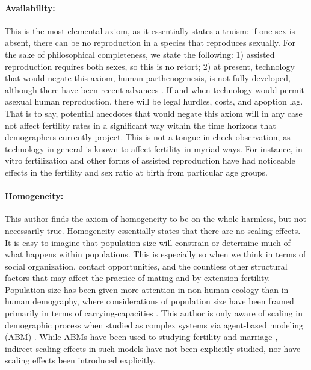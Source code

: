 \paragraph{Availability:} This is the most elemental axiom, as it essentially
states a truism: if one sex is absent, there can be no reproduction in a species
that reproduces sexually. For the sake of philosophical completeness, we state
the following: 1) assisted reproduction requires both sexes, so this is no
retort; 2) at present, technology that would negate this axiom, human
parthenogenesis, is not fully developed, although there have been recent
advances \citep{revazova2007patient}. If and when technology would permit
asexual human reproduction, there will be legal hurdles, costs, and apoption lag. 
That is to say, potential anecdotes that would negate this axiom
will in any case not affect fertility rates in a significant way within the time
horizons that demographers currently project. This is not a tongue-in-cheek
observation, as technology in general is known to affect fertility in myriad
ways. For instance, in vitro fertilization and other forms of assisted
reproduction have had noticeable effects in the fertility and sex ratio at birth from particular
age groups.

\paragraph{Homogeneity:} This author finds the axiom of homogeneity to be on the
whole harmless, but not necessarily true. Homogeneity essentially states that
there are no scaling effects. It is easy to imagine that population size will
constrain or determine much of what happens within populations. This is
especially so when we think in terms of social organization, contact
opportunities, and the countless other structural factors that may affect the
practice of mating and by extension fertility. Population size has been
given more attention in non-human ecology \citep{donalson1999population} than in
human demography, where considerations of population size have been framed
primarily in terms of carrying-capacities \citep[see
e.g., ][]{cohen1995human,hopfenberg2003human}. This author is only aware of
scaling in demographic process when studied as complex systems via agent-based modeling (ABM) \citep[e.g., ][]{bruch2010scaling}. While ABMs have
been used to studying fertility and marriage \citep{billari2002wedding},
indirect scaling effects in such models have not been explicitly studied, nor
have scaling effects been introduced explicitly.

